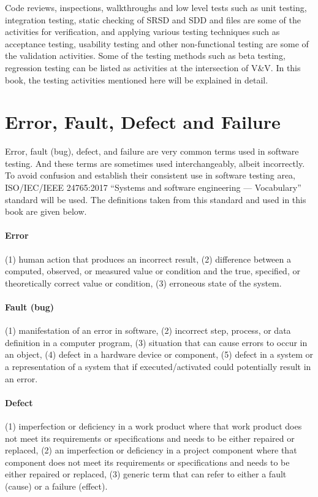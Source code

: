 Code reviews, inspections, walkthroughs and low level tests such as unit testing, integration testing, static checking of SRSD and SDD and files are some of the activities for verification, and applying various testing techniques such as acceptance testing, usability testing and other non-functional testing are some of the validation activities. Some of the testing methods such as beta testing, regression testing can be listed as activities at the intersection of V\&V. In this book, the testing activities mentioned here will be explained in detail.

\section{Error, Fault, Defect and Failure}
Error, fault (bug), defect, and failure are very common terms used in software testing. And these terms are sometimes used interchangeably, albeit incorrectly. To avoid confusion and establish their consistent use in software testing area, ISO/IEC/IEEE 24765:2017 “Systems and software engineering — Vocabulary” standard will be used. The definitions taken from this standard and used in this book are given below.

\paragraph{Error}
(1) human action that produces an incorrect result, (2) difference between a computed, observed, or measured value or condition and the true, specified, or theoretically correct value or condition, (3) erroneous state of the system.

\paragraph{Fault (bug)}
(1) manifestation of an error in software, (2) incorrect step, process, or data definition in a computer program, (3) situation that can cause errors to occur in an object, (4) defect in a hardware device or component, (5) defect in a system or a representation of a system that if executed/activated could potentially result in an error.

\paragraph{Defect}
(1) imperfection or deficiency in a work product where that work product does not meet its requirements or specifications and needs to be either repaired or replaced, (2) an imperfection or deficiency in a project component where that component does not meet its requirements or specifications and needs to be either repaired or replaced, (3) generic term that can refer to either a fault (cause) or a failure (effect). 

